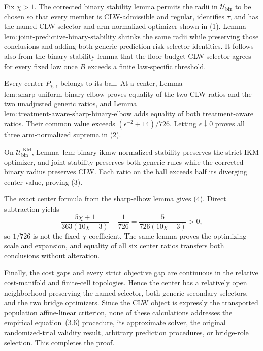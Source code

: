 Fix \(\chi>1\).  The corrected binary stability lemma permits the radii in \(\mathcal U_{\mathrm{bin}}\) to be chosen so that every member is CLW-admissible and regular, identifies \(\tau\), and has the named CLW selector and arm-normalized optimizer shown in (1).  Lemma~\(\mathrm{lem{:}joint\text{-}predictive\text{-}binary\text{-}stability}\) shrinks the same radii while preserving those conclusions and adding both generic prediction-risk selector identities.  It follows also from the binary stability lemma that the floor-budget CLW selector agrees for every fixed law once \(B\) exceeds a finite law-specific threshold.

Every center \(P_{\chi,\epsilon}\) belongs to its ball.  At a center, Lemma~\(\mathrm{lem{:}sharp\text{-}uniform\text{-}binary\text{-}elbow}\) proves equality of the two CLW ratios and the two unadjusted generic ratios, and Lemma~\(\mathrm{lem{:}treatment\text{-}aware\text{-}sharp\text{-}binary\text{-}elbow}\) adds equality of both treatment-aware ratios.  Their common value exceeds \((\epsilon^{-2}+14)/726\).  Letting \(\epsilon\downarrow0\) proves all three arm-normalized suprema in (2).

On \(\mathcal U_{\mathrm{bin}}^{\mathrm{IKM}}\), Lemma~\(\mathrm{lem{:}binary\text{-}ikmw\text{-}normalized\text{-}stability}\) preserves the strict IKM optimizer, and joint stability preserves both generic rules while the corrected binary radius preserves CLW.  Each ratio on the ball exceeds half its diverging center value, proving (3).

The exact center formula from the sharp-elbow lemma gives (4).  Direct subtraction yields
\[
 \frac{5\chi+1}{363(10\chi-3)}-\frac1{726}
 =\frac5{726(10\chi-3)}>0,
\]
so \(1/726\) is not the fixed-\(\chi\) coefficient.  The same lemma proves the optimizing scale and expansion, and equality of all six center ratios transfers both conclusions without alteration.

Finally, the cost gaps and every strict objective gap are continuous in the relative cost-manifold and finite-cell topologies.  Hence the center has a relatively open neighborhood preserving the named selector, both generic secondary selectors, and the two bridge optimizers.  Since the CLW object is expressly the transported population affine-linear criterion, none of these calculations addresses the empirical equation~(3.6) procedure, its approximate solver, the original randomized-trial validity result, arbitrary prediction procedures, or bridge-role selection.  This completes the proof.